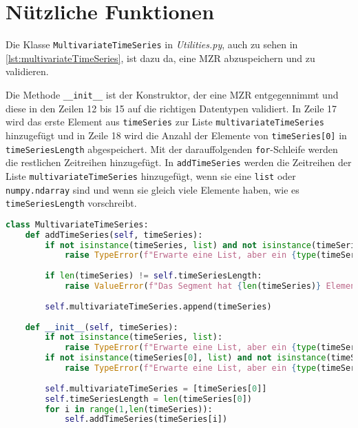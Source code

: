\section{Nützliche Funktionen}
Die Klasse \lstinline|MultivariateTimeSeries| in \textit{Utilities.py}, auch zu sehen in \autoref{lst:multivariateTimeSeries}, ist dazu da, eine \ac{MZR} abzuspeichern und zu validieren.

Die Methode \lstinline{__init__} ist der Konstruktor, der eine \ac{MZR} entgegennimmt und diese in den Zeilen 12 bis 15 auf die richtigen Datentypen validiert. In Zeile 17 wird das erste Element aus \lstinline|timeSeries| zur Liste \lstinline|multivariateTimeSeries| hinzugefügt und in Zeile 18 wird die Anzahl der Elemente von \lstinline|timeSeries[0]| in \lstinline|timeSeriesLength| abgespeichert. Mit der darauffolgenden \lstinline|for|-Schleife werden die restlichen Zeitreihen hinzugefügt. In \lstinline|addTimeSeries| werden die Zeitreihen der Liste \lstinline|multivariateTimeSeries| hinzugefügt, wenn sie eine \lstinline|list| oder \lstinline|numpy.ndarray| sind und wenn sie gleich viele Elemente haben, wie es \lstinline|timeSeriesLength| vorschreibt. 
\begin{lstlisting}[caption=Klasse für \ac{MZR}, language=Python, label=lst:multivariateTimeSeries, style=Python]
class MultivariateTimeSeries:
    def addTimeSeries(self, timeSeries):
        if not isinstance(timeSeries, list) and not isinstance(timeSeries, np.ndarray):
            raise TypeError(f"Erwarte eine List, aber ein {type(timeSeries)} erhalten.")
        
        if len(timeSeries) != self.timeSeriesLength:
            raise ValueError(f"Das Segment hat {len(timeSeries)} Element(e), muss aber {self.timeSeriesLength} haben.")
        
        self.multivariateTimeSeries.append(timeSeries)
    
    def __init__(self, timeSeries):
        if not isinstance(timeSeries, list):
            raise TypeError(f"Erwarte eine List, aber ein {type(timeSeries)} erhalten.")
        if not isinstance(timeSeries[0], list) and not isinstance(timeSeries[0], np.ndarray):
            raise TypeError(f"Erwarte eine List, aber ein {type(timeSeries[0])} erhalten.")
        
        self.multivariateTimeSeries = [timeSeries[0]]
        self.timeSeriesLength = len(timeSeries[0])
        for i in range(1,len(timeSeries)):
            self.addTimeSeries(timeSeries[i])
\end{lstlisting}

